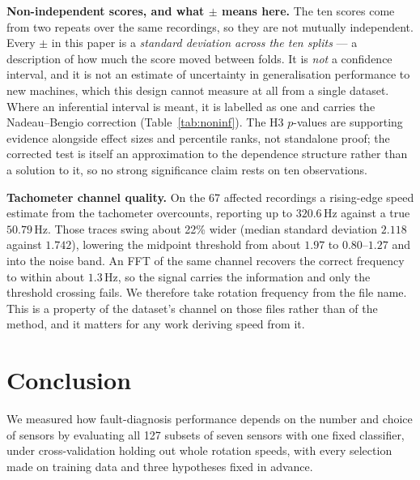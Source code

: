 \documentclass[conference]{IEEEtran}
\begin{document}
\textbf{Non-independent scores, and what $\pm$ means here.} The ten scores come
from two repeats over the same recordings, so they are not mutually
independent. Every $\pm$ in this paper is a \emph{standard deviation across
the ten splits} — a description of how much the score moved between folds. It
is \emph{not} a confidence interval, and it is not an estimate of uncertainty
in generalisation performance to new machines, which this design cannot
measure at all from a single dataset. Where an inferential interval is meant,
it is labelled as one and carries the Nadeau--Bengio correction
(Table~\ref{tab:noninf}). The H3 $p$-values are supporting evidence alongside
effect sizes and percentile ranks, not standalone proof; the corrected test is
itself an approximation to the dependence structure rather than a solution to
it, so no strong significance claim rests on ten observations.

\textbf{Tachometer channel quality.} On the 67 affected recordings a
rising-edge speed estimate from the tachometer overcounts, reporting up to
$320.6$\,Hz against a true $50.79$\,Hz. Those traces swing about 22\% wider
(median standard deviation $2.118$ against $1.742$), lowering the midpoint
threshold from about $1.97$ to $0.80$--$1.27$ and into the noise band. An FFT
of the same channel recovers the correct frequency to within about $1.3$\,Hz,
so the signal carries the information and only the threshold crossing fails. We
therefore take rotation frequency from the file name. This is a property of the
dataset's channel on those files rather than of the method, and it matters for
any work deriving speed from it.

\section{Conclusion}

We measured how fault-diagnosis performance depends on the number and choice of
sensors by evaluating all 127 subsets of seven sensors with one fixed
classifier, under cross-validation holding out whole rotation speeds, with
every selection made on training data and three hypotheses fixed in advance.
\end{document}
